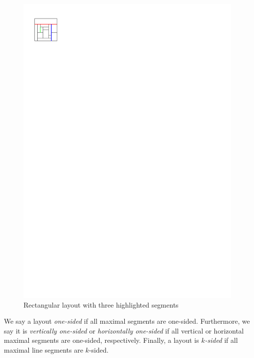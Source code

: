   \begin{figure}[h]
    \centering
    \includegraphics[scale=1]{rectangularDuals/img/segmentdefs}
    \caption{Rectangular layout with three highlighted segments}
    \label{fig:rect:segmentdefs}
  \end{figure}

  We say a layout \emph{one-sided} if all maximal segments are one-sided.
  Furthermore,  we say it is \emph{vertically one-sided} or \emph{horizontally one-sided} if all vertical or horizontal maximal segments are one-sided, respectively. Finally, a layout is \emph{$k$-sided} if all maximal line segments are $k$-sided.


